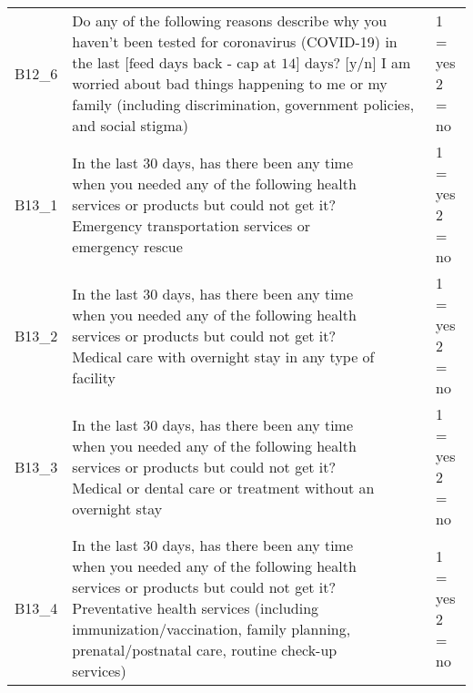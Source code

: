 \begin{tabularx}{\linewidth}{p{1.9cm} <{\RaggedRight}X <{\RaggedRight\arraybackslash}p{4.3cm}}
    B12\_6& \thead{Do any of the following reasons describe\\ why you haven't been tested for\\ coronavirus (COVID-19) in the last\\ $\text{[feed days back - cap at 14] days? [y/n]}$\\I am worried about bad things happening\\ to me or my family (including discrimination,\\ government policies, and social stigma)} & \thead{1 = yes\\2 = no}  \\
    B13\_1& \thead{In the last 30 days, has there been any time\\ when you needed any of the following health\\ services or products but could not get it?\\Emergency transportation services or\\ emergency rescue} & \thead{1 = yes\\2 = no} \\
    B13\_2& \thead{In the last 30 days, has there been any time\\ when you needed any of the following health\\ services or products but could not get it?\\Medical care with overnight stay in any type of \\facility} & \thead{1 = yes\\2 = no} \\
    B13\_3& \thead{In the last 30 days, has there been any time\\ when you needed any of the following health\\ services or products but could not get it?\\Medical or dental care or treatment without an \\overnight stay} & \thead{1 = yes\\2 = no} \\
    B13\_4& \thead{In the last 30 days, has there been any time\\ when you needed any of the following health\\ services or products but could not get it?\\Preventative health services (including\\ immunization/vaccination, family planning,\\ prenatal/postnatal care, routine check-up\\ services)} & \thead{1 = yes\\2 = no} \\

\end{tabularx}
